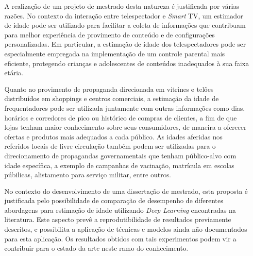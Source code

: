 
A realização de um projeto de mestrado desta natureza é justificada por várias razões. No contexto da interação entre telespectador e \emph{Smart} TV, um estimador de idade pode ser utilizado para facilitar a coleta de informações que contribuam para melhor experiência de provimento de conteúdo e de configurações personalizadas. Em particular, a estimação de idade dos telespectadores pode ser especialmente empregada na implementação de um controle parental mais eficiente, protegendo crianças e adolescentes de conteúdos inadequados à sua faixa etária.

Quanto ao provimento de propaganda direcionada em vitrines e telões distribuídos em shoppings e centros comerciais, a estimação da idade de frequentadores pode ser utilizada juntamente com outras informações como dias, horários e corredores de pico ou histórico de compras de clientes, a fim de que lojas tenham maior conhecimento sobre seus consumidores, de maneira a oferecer ofertas e produtos mais adequados a cada público. As idades aferidas nos referidos locais de livre circulação também podem ser utilizadas para o direcionamento de propagandas governamentais que tenham público-alvo com idade específica, a exemplo de campanhas de vacinação, matrícula em escolas púbilicas, alistamento para serviço militar, entre outros.

No contexto do desenvolvimento de uma dissertação de mestrado, esta proposta é justificada pelo possibilidade de comparação de desempenho de diferentes abordagens para estimação de idade utilizando \emph{Deep Learning} encontradas na literatura. Este aspecto prevê a reprodutibilidade de resultados previamente descritos, e possibilita a aplicação de técnicas e modelos ainda não documentados para esta aplicação. Os resultados obtidos com tais experimentos podem vir a contribuir para o estado da arte neste ramo do conhecimento.
